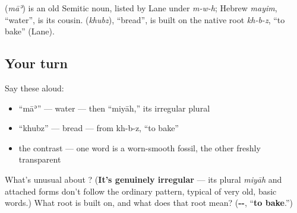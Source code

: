 \begin{cousinweb}
\textbf{} (\emph{māʾ}) is an old Semitic noun, listed by Lane under \emph{m-w-h}; Hebrew \emph{mayim}, \textquotedblleft{}water\textquotedblright{}, is its cousin. \textbf{} (\emph{khubz}), \textquotedblleft{}bread\textquotedblright{}, is built on the native root \emph{kh-b-z}, \textquotedblleft{}to bake\textquotedblright{} (Lane).
\end{cousinweb}

\subsection*{Your turn}
Say these aloud:

\begin{itemize}
\raggedright
  \item \textquotedblleft{}māʾ\textquotedblright{} — water — then \textquotedblleft{}miyāh,\textquotedblright{} its irregular plural
  \item \textquotedblleft{}khubz\textquotedblright{} — bread — from kh-b-z, \textquotedblleft{}to bake\textquotedblright{}
  \item the contrast — one word is a worn-smooth fossil, the other freshly transparent
\end{itemize}

\begin{tcolorbox}[breakable,colback=teal!4,colframe=teal!35!black,title={Before you move on}]
What's unusual about \textbf{}? (\textbf{It's genuinely irregular} — its plural \emph{miyāh} and attached forms don't follow the ordinary pattern, typical of very old, basic words.) What root is \textbf{} built on, and what does that root mean? (\textbf{--}, \textquotedblleft{}\textbf{to bake}.\textquotedblright{})
\end{tcolorbox}
